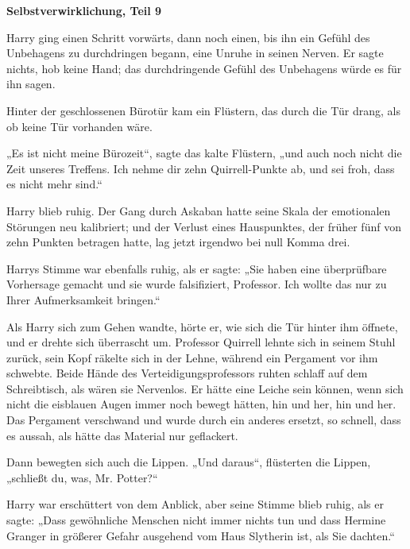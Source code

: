

\hypertarget{selbstverwirklichung-teil-9}{%

\textbf{Selbstverwirklichung, Teil 9}

Harry ging einen Schritt vorwärts, dann noch einen, bis ihn ein Gefühl des Unbehagens zu durchdringen begann, eine Unruhe in seinen Nerven. Er sagte nichts, hob keine Hand; das durchdringende Gefühl des Unbehagens würde es für ihn sagen.

Hinter der geschlossenen Bürotür kam ein Flüstern, das durch die Tür drang, als ob keine Tür vorhanden wäre.

„Es ist nicht meine Bürozeit“, sagte das kalte Flüstern, „und auch noch nicht die Zeit unseres Treffens. Ich nehme dir zehn Quirrell-Punkte ab, und sei froh, dass es nicht mehr sind.“

Harry blieb ruhig. Der Gang durch Askaban hatte seine Skala der emotionalen Störungen neu kalibriert; und der Verlust eines Hauspunktes, der früher fünf von zehn Punkten betragen hatte, lag jetzt irgendwo bei null Komma drei.

Harrys Stimme war ebenfalls ruhig, als er sagte: „Sie haben eine überprüfbare Vorhersage gemacht und sie wurde falsifiziert, Professor. Ich wollte das nur zu Ihrer Aufmerksamkeit bringen.“

Als Harry sich zum Gehen wandte, hörte er, wie sich die Tür hinter ihm öffnete, und er drehte sich überrascht um. Professor Quirrell lehnte sich in seinem Stuhl zurück, sein Kopf räkelte sich in der Lehne, während ein Pergament vor ihm schwebte. Beide Hände des Verteidigungsprofessors ruhten schlaff auf dem Schreibtisch, als wären sie Nervenlos. Er hätte eine Leiche sein können, wenn sich nicht die eisblauen Augen immer noch bewegt hätten, hin und her, hin und her. Das Pergament verschwand und wurde durch ein anderes ersetzt, so schnell, dass es aussah, als hätte das Material nur geflackert.

Dann bewegten sich auch die Lippen. „Und daraus“, flüsterten die Lippen, „schließt du, was, Mr. Potter?“

Harry war erschüttert von dem Anblick, aber seine Stimme blieb ruhig, als er sagte: „Dass gewöhnliche Menschen nicht immer nichts tun und dass Hermine Granger in größerer Gefahr ausgehend vom Haus Slytherin ist, als Sie dachten.“

}
